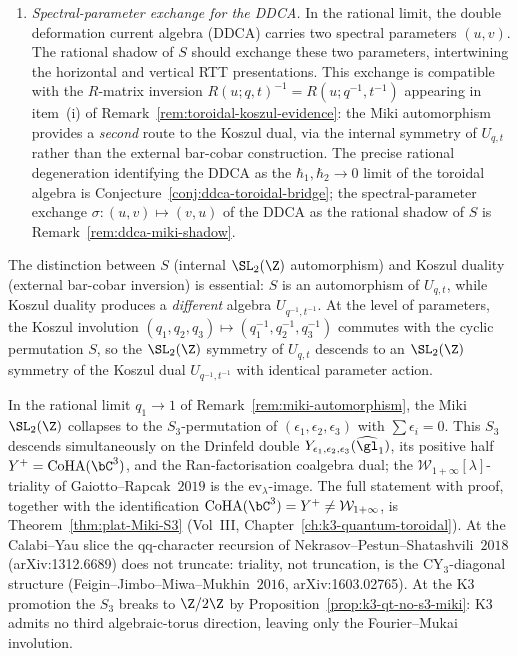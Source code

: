 \begin{remark}
\begin{enumerate}[label=\textup{(\alph*)}]
\item \emph{Spectral-parameter exchange for the DDCA.} In the rational
 limit, the double deformation current algebra (DDCA) carries two
 spectral parameters $(u,v)$. The rational shadow of $S$ should exchange
 these two parameters, intertwining the horizontal and vertical RTT
 presentations. This exchange is compatible with the $R$-matrix inversion
 $R(u;q,t)^{-1} = R(u;q^{-1},t^{-1})$ appearing in item~(i) of
 Remark~\ref{rem:toroidal-koszul-evidence}: the Miki automorphism
 provides a \emph{second} route to the Koszul dual, via the internal
 symmetry of $U_{q,t}$ rather than the external bar-cobar construction.
 The precise rational degeneration identifying the DDCA as the
 $\hbar_1, \hbar_2 \to 0$ limit of the toroidal algebra is
 Conjecture~\ref{conj:ddca-toroidal-bridge}; the spectral-parameter
 exchange $\sigma \colon (u,v) \mapsto (v,u)$ of the DDCA as the
 rational shadow of $S$ is Remark~\ref{rem:ddca-miki-shadow}.
\end{enumerate}

The distinction between $S$ (internal $\SL_2(\Z)$ automorphism) and
Koszul duality (external bar-cobar inversion) is essential: $S$ is an
automorphism of $U_{q,t}$, while Koszul duality produces a
\emph{different} algebra $U_{q^{-1},t^{-1}}$. At the level of
parameters, the Koszul involution $(q_1,q_2,q_3) \mapsto
(q_1^{-1},q_2^{-1},q_3^{-1})$ commutes with the cyclic permutation
$S$, so the $\SL_2(\Z)$ symmetry of $U_{q,t}$ descends to an
$\SL_2(\Z)$ symmetry of the Koszul dual $U_{q^{-1},t^{-1}}$ with
identical parameter action.
\end{remark}

In the rational limit $q_1 \to 1$ of Remark~\ref{rem:miki-automorphism}, the Miki $\SL_2(\Z)$ collapses to the $S_3$-permutation of $(\epsilon_1, \epsilon_2, \epsilon_3)$ with $\sum \epsilon_i = 0$. This $S_3$ descends simultaneously on the Drinfeld double $Y_{\epsilon_1,\epsilon_2,\epsilon_3}(\widehat{\gl}_1)$, its positive half $Y^+ = \mathrm{CoHA}(\bC^3)$, and the Ran-factorisation coalgebra dual; the $\mathcal{W}_{1+\infty}[\lambda]$-triality of Gaiotto--Rapcak~$2019$ is the $\mathrm{ev}_\lambda$-image. The full statement with proof, together with the identification $\mathrm{CoHA}(\bC^3) = Y^+ \neq \mathcal{W}_{1+\infty}$, is Theorem~\ref{thm:plat-Miki-S3} (Vol~III, Chapter~\ref{ch:k3-quantum-toroidal}). At the Calabi--Yau slice the qq-character recursion of Nekrasov--Pestun--Shatashvili~$2018$ (arXiv:1312.6689) does not truncate: triality, not truncation, is the CY$_3$-diagonal structure (Feigin--Jimbo--Miwa--Mukhin~$2016$, arXiv:1603.02765). At the K3 promotion the $S_3$ breaks to $\Z/2\Z$ by Proposition~\ref{prop:k3-qt-no-s3-miki}: K3 admits no third algebraic-torus direction, leaving only the Fourier--Mukai involution.

